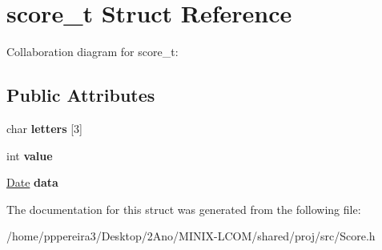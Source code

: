 \hypertarget{structscore__t}{}\section{score\+\_\+t Struct Reference}
\label{structscore__t}


Collaboration diagram for score\+\_\+t\+:
\subsection*{Public Attributes}
\begin{DoxyCompactItemize}
\item 
char {\bfseries letters} \mbox{[}3\mbox{]}
\item 
int {\bfseries value}
\item 
\hyperlink{structdate}{Date} {\bfseries data}
\end{DoxyCompactItemize}


The documentation for this struct was generated from the following file\+:\begin{DoxyCompactItemize}
\item 
/home/pppereira3/\+Desktop/2\+Ano/\+M\+I\+N\+I\+X-\/\+L\+C\+O\+M/shared/proj/src/Score.\+h\end{DoxyCompactItemize}
